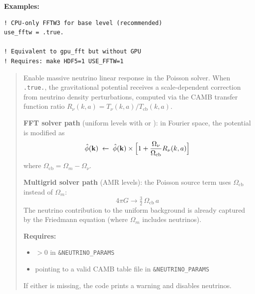 \noindent\textcolor{apidefault}{\textsf{\textbf{Examples:}}}
\begin{lstlisting}
! CPU-only FFTW3 for base level (recommended)
use_fftw = .true.

! Equivalent to gpu_fft but without GPU
! Requires: make HDF5=1 USE_FFTW=1
\end{lstlisting}

\label{param:use_neutrino}

\begin{quote}
Enable massive neutrino linear response in the Poisson solver.  When
\texttt{.true.}, the gravitational potential receives a scale-dependent
correction from neutrino density perturbations, computed via the CAMB
transfer function ratio $R_\nu(k,a) = T_\nu(k,a) / T_{\mathrm{cb}}(k,a)$.

\textbf{FFT solver path} (uniform levels with  or
): in Fourier space, the potential is modified as
\[
  \hat\phi(\mathbf{k}) \;\leftarrow\; \hat\phi(\mathbf{k}) \times
  \Bigl[1 + \frac{\Omega_\nu}{\Omega_{\mathrm{cb}}} R_\nu(k, a)\Bigr]
\]
where $\Omega_{\mathrm{cb}} = \Omega_m - \Omega_\nu$.

\textbf{Multigrid solver path} (AMR levels): the Poisson source term
uses $\Omega_{\mathrm{cb}}$ instead of $\Omega_m$:
\[
  4\pi G \to \tfrac{3}{2}\,\Omega_{\mathrm{cb}}\,a
\]
The neutrino contribution to the uniform background is already captured
by the Friedmann equation (where $\Omega_m$ includes neutrinos).

\textbf{Requires:}
\begin{itemize}[nosep]
  \item {} $> 0$ in \texttt{\&NEUTRINO\_PARAMS}
  \item {} pointing to a valid CAMB table file
        in \texttt{\&NEUTRINO\_PARAMS}
\end{itemize}

If either is missing, the code prints a warning and disables neutrinos.

\end{quote}

